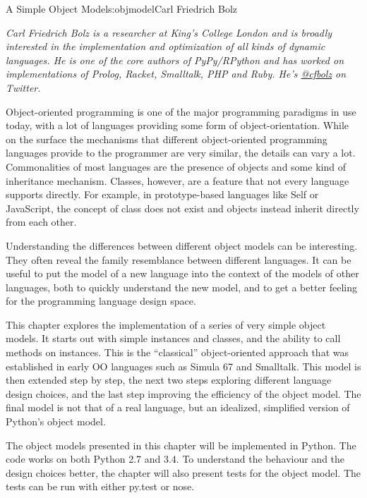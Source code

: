 \begin{aosachapter}{A Simple Object Model}{s:objmodel}{Carl Friedrich Bolz}

\emph{Carl Friedrich Bolz is a researcher at King's College London and
is broadly interested in the implementation and optimization of all
kinds of dynamic languages. He is one of the core authors of
PyPy/RPython and has worked on implementations of Prolog, Racket,
Smalltalk, PHP and Ruby. He's \href{https://twitter.com/cfbolz}{@cfbolz}
on Twitter.}

\label{introduction}

Object-oriented programming is one of the major programming paradigms in
use today, with a lot of languages providing some form of
object-orientation. While on the surface the mechanisms that different
object-oriented programming languages provide to the programmer are very
similar, the details can vary a lot. Commonalities of most languages are
the presence of objects and some kind of inheritance mechanism. Classes,
however, are a feature that not every language supports directly. For
example, in prototype-based languages like Self or JavaScript, the
concept of class does not exist and objects instead inherit directly
from each other.

Understanding the differences between different object models can be
interesting. They often reveal the family resemblance between different
languages. It can be useful to put the model of a new language into the
context of the models of other languages, both to quickly understand the
new model, and to get a better feeling for the programming language
design space.

This chapter explores the implementation of a series of very simple
object models. It starts out with simple instances and classes, and the
ability to call methods on instances. This is the ``classical''
object-oriented approach that was established in early OO languages such
as Simula 67 and Smalltalk. This model is then extended step by step,
the next two steps exploring different language design choices, and the
last step improving the efficiency of the object model. The final model
is not that of a real language, but an idealized, simplified version of
Python's object model.

The object models presented in this chapter will be implemented in
Python. The code works on both Python 2.7 and 3.4. To understand the
behaviour and the design choices better, the chapter will also present
tests for the object model. The tests can be run with either py.test or
nose.


\end{aosachapter}

